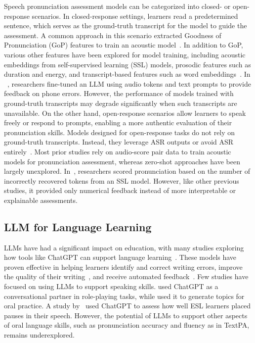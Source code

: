 \documentclass[11pt]{article}
\begin{document}
Speech pronunciation assessment models can be categorized into closed- or open-response scenarios. In closed-response settings, learners read a predetermined sentence, which serves as the ground-truth transcript for the model to guide the assessment. A common approach in this scenario extracted Goodness of Pronunciation (GoP) features to train an acoustic model~\cite{gong2022transformer, do2023hierarchical}. In addition to GoP, various other features have been explored for model training, including acoustic embeddings from self-supervised learning (SSL) models, prosodic features such as duration and energy, and transcript-based features such as word embeddings~\cite{chao20223m, yan2025conpco}. In ~\cite{wu2025integrating}, researchers fine-tuned an LLM using audio tokens and text prompts to provide feedback on phone errors. However, the performance of models trained with ground-truth transcripts may degrade significantly when such transcripts are unavailable. On the other hand, open-response scenarios allow learners to speak freely or respond to prompts, enabling a more authentic evaluation of their pronunciation skills. Models designed for open-response tasks do not rely on ground-truth transcripts. Instead, they leverage ASR outputs or avoid ASR entirely~\cite{lin2021deep, kim2022automatic, chen2023multipa, liu2023asr}. Most prior studies rely on audio-score pair data to train acoustic models for pronunciation assessment, whereas zero-shot approaches have been largely unexplored. In~\cite{liu2023zero}, researchers scored pronunciation based on the number of incorrectly recovered tokens from an SSL model. However, like other previous studies, it provided only numerical feedback instead of more interpretable or explainable assessments.

\subsection{LLM for Language Learning}

LLMs have had a significant impact on education, with many studies exploring how tools like ChatGPT can support language learning~\cite{lo2024exploring, c2023impact}. These models have proven effective in helping learners identify and correct writing errors, improve the quality of their writing~\cite{barrot2023using}, and receive automated feedback~\cite{mizumoto2023exploring}. Few studies have focused on using LLMs to support speaking skills. \cite{kim2023young} used ChatGPT as a conversational partner in role-playing tasks, while \cite{lee2023visionary} used it to generate topics for oral practice. A study by~\cite{wang2023assessing} used ChatGPT to assess how well ESL learners placed pauses in their speech. However, the potential of LLMs to support other aspects of oral language skills, such as pronunciation accuracy and fluency as in TextPA, remains underexplored.
\end{document}
